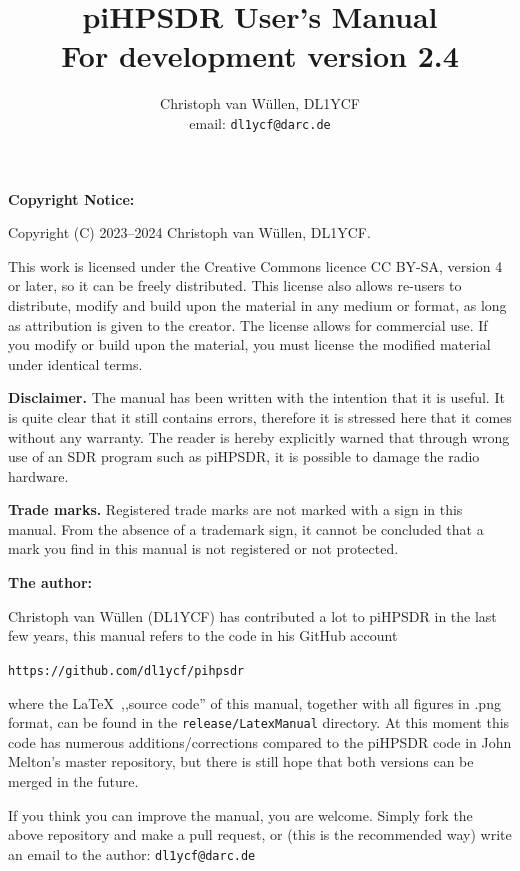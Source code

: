 \documentclass[12pt]{book}
\def\pH{pi\-HPSDR\xspace}
\begin{document}
\frontmatter
\title{
\pH User's Manual \\
\small{For development version 2.4}
}
\author{
Christoph van W\"ullen, DL1YCF \\
email: \texttt{dl1ycf@darc.de}
}

\maketitle
\textbf{Copyright Notice:}

Copyright (C) 2023--2024 Christoph van W\"ullen, DL1YCF.

This work is licensed under
the Creative Commons licence CC BY-SA, version 4 or later, so it can be freely distributed.
 This license also allows re-users to distribute, modify and build upon the material in any medium or format,
as long as attribution is given to the creator. The license allows for commercial use.
If you modify or build upon the material, you must license the modified material under identical terms.

\textbf{Disclaimer.} The manual has been written with the intention that it is useful. It is quite clear
that it still contains errors, therefore it is stressed here that it comes without any warranty. The reader
is hereby explicitly warned that through wrong use of an SDR program such as \pH, it is possible to
damage the radio hardware.

\textbf{Trade marks.} Registered trade marks are not marked with a sign in this manual. From the absence of
a trademark sign, it cannot be concluded that a mark you find in this manual is not registered or not
protected.

\bigskip
\textbf{The author:}

Christoph van W\"ullen (DL1YCF) has contributed a lot to \pH in the last few years, this manual refers
to the code in his GitHub account

\texttt{https://github.com/dl1ycf/pihpsdr}

where the \LaTeX\   ,,source code'' of this manual, together with all figures in .png format, can be found
in the \texttt{release/LatexManual} directory. At this moment this code has numerous additions/corrections
 compared
to the \pH code in John Melton's master repository, but there is still hope that both versions can
be merged in  the  future.

If you think you can improve the manual, you are welcome.
Simply fork the above repository and make a pull request, or (this is the recommended way) write an
email to the author: \texttt{dl1ycf@darc.de}
\tableofcontents
\mainmatter
\end{document}
